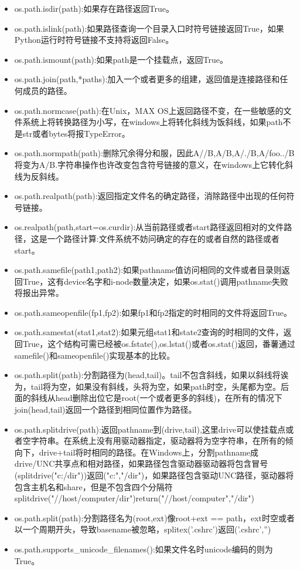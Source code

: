 \begin{itemize}
\item os.path.isdir(path):如果存在路径返回True。
\item os.path.islink(path):如果路径查询一个目录入口时符号链接返回True，如果Python运行时符号链接不支持将返回False。
\item os.path.ismount(path):如果path是一个挂载点，返回True。
\item os.path.join(path,*paths):加入一个或者更多的组建，返回值是连接路径和任何成员的路径。
\item os.path.normcase(path):在Unix，MAX OS上返回路径不变，在一些敏感的文件系统上将转换路径为小写，在windows上将转化斜线为饭斜线，如果path不是str或者bytes将报TypeError。
\item os.path.normpath(path):删除冗余得分和服，因此A//B,A/B,A/./B,A/foo../B将变为A/B.字符串操作也许改变包含符号链接的意义，在windows上它转化斜线为反斜线。
\item os.path.realpath(path):返回指定文件名的确定路径，消除路径中出现的任何符号链接。
\item os.realpath(path,start=os.curdir):从当前路径或者start路径返回相对的文件路径，这是一个路径计算:文件系统不妨问确定的存在的或者自然的路径或者start。
\item os.path.samefile(path1,path2):如果pathname值访问相同的文件或者目录则返回True，这有device名字和i-node数量决定，如果os.stat()调用pathname失败将报出异常。
\item os.path.sameopenfile(fp1,fp2):如果fp1和fp2指定的时相同的文件将返回True。
\item os.path.samestat(stat1,stat2):如果元组stat1和state2查询的时相同的文件，返回True，这个结构可需已经被os.fstate(),os.lstat()或者os.stat()返回，番薯通过samefile()和sameopenfile()实现基本的比较。
\item os.path.split(path):分割路径为(head,tail)。tail不包含斜线，如果以斜线将诶为，tail将为空，如果没有斜线，头将为空，如果path时空，头尾都为空。后面的斜线从head删除出位它是root(一个或者更多的斜线)，在所有的情况下join(head,tail)返回一个路径到相同位置作为路径。

\item os.path.splitdrive(path):返回pathname到(drive,tail),这里drive可以使挂载点或者空字符串。在系统上没有用驱动器指定，驱动器将为空字符串，在所有的倾向下，drive+tail将时相同的路径。在Windows上，分割pathname成drive/UNC共享点和相对路径，如果路径包含驱动器驱动器将包含冒号(splitdrive("c:/dir"))返回("c:","/dir")，如果路径包含驱动UNC路径，驱动器将包含主机名和share，但是不包含四个分隔符splitdrive("//host/computer/dir")return("//host/computer","/dir")
\item os.path.split(path):分割路径名为(root,ext)像root+ext == path，ext时空或者以一个周期开头，导致basename被忽略，splitex('.cshrc')返回('.cshrc','')
\item os.path.supports\_unicode\_filenames():如果文件名时unicode编码的则为True。
\end{itemize}
